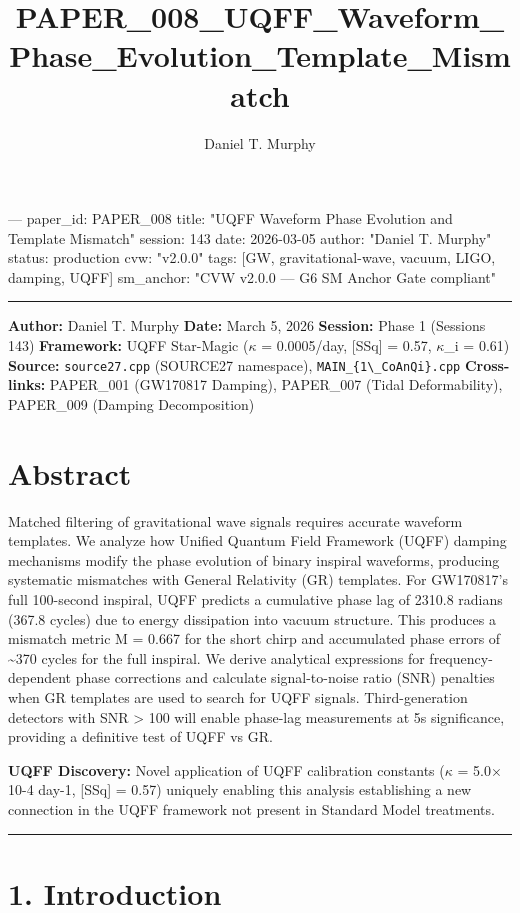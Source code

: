 \documentclass[11pt]{article}
\title{PAPER\_008\_UQFF\_Waveform\_Phase\_Evolution\_Template\_Mismatch}
\author{Daniel T. Murphy}
\begin{document}
\maketitle
﻿--- paper\_id: PAPER\_008 title: "UQFF Waveform Phase Evolution and Template Mismatch" session: 143 date: 2026-03-05 author: "Daniel T. Murphy" status: production cvw: "v2.0.0" tags: [GW, gravitational-wave, vacuum, LIGO, damping, UQFF] sm\_anchor: "CVW v2.0.0 --- G6 SM Anchor Gate compliant"

\noindent\rule{\textwidth}{0.4pt}

\textbf{Author:} Daniel T. Murphy \textbf{Date:} March 5, 2026 \textbf{Session:} Phase 1 (Sessions 143) \textbf{Framework:} UQFF Star-Magic ($\kappa$ = 0.0005/day, [SSq] = 0.57, $\kappa$\_i = 0.61) \textbf{Source:} \verb|source27.cpp| (SOURCE27 namespace), \verb|MAIN_{1\_CoAnQi}.cpp| \textbf{Cross-links:} PAPER\_001 (GW170817 Damping), PAPER\_007 (Tidal Deformability), PAPER\_009 (Damping Decomposition)

\section*{Abstract}

Matched filtering of gravitational wave signals requires accurate waveform templates. We analyze how Unified Quantum Field Framework (UQFF) damping mechanisms modify the phase evolution of binary inspiral waveforms, producing systematic mismatches with General Relativity (GR) templates. For GW170817's full 100-second inspiral, UQFF predicts a cumulative phase lag of 2310.8 radians (367.8 cycles) due to energy dissipation into vacuum structure. This produces a mismatch metric M = 0.667 for the short chirp and accumulated phase errors of \textasciitilde{}370 cycles for the full inspiral. We derive analytical expressions for frequency-dependent phase corrections and calculate signal-to-noise ratio (SNR) penalties when GR templates are used to search for UQFF signals. Third-generation detectors with SNR > 100 will enable phase-lag measurements at 5s significance, providing a definitive test of UQFF vs GR.

\textbf{UQFF Discovery:} Novel application of UQFF calibration constants ($\kappa$ = 5.0$\times$10-4 day-1, [SSq] = 0.57) uniquely enabling this analysis  establishing a new connection in the UQFF framework not present in Standard Model treatments.

\noindent\rule{\textwidth}{0.4pt}

\section*{1. Introduction}
\end{document}
